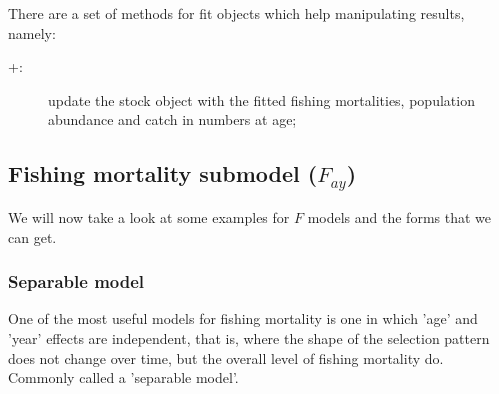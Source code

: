 \documentclass[a4paper,english,11pt]{article}
\begin{document}
There are a set of methods for \aFa fit objects which help manipulating  results, namely:

\begin{description}
	\item [+:] update the stock object with the fitted fishing mortalities, population abundance and catch in numbers at age; 
\end{description}


\subsection{Fishing mortality submodel ($F_{ay}$)}



We will now take a look at some examples for $F$ models and the forms that we can get.

%
%
%
%
%
%
\subsubsection{Separable model}

One of the most useful models for fishing mortality is one in which 'age' and 'year' effects are independent, that is, where the shape of the selection pattern does not change over time, but the overall level of fishing mortality do. Commonly called a 'separable model'. 
\end{document}
